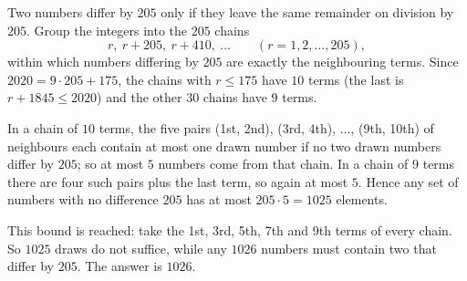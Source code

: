 Two numbers differ by $205$ only if they leave the same remainder on division by $205$. Group the integers into the $205$ chains
\[r,\ r+205,\ r+410,\ \dots\qquad(r=1,2,\dots,205),\]
within which numbers differing by $205$ are exactly the neighbouring terms. Since $2020=9\cdot205+175$, the chains with $r\le175$ have $10$ terms (the last is $r+1845\le2020$) and the other $30$ chains have $9$ terms.

In a chain of $10$ terms, the five pairs (1st, 2nd), (3rd, 4th), $\dots$, (9th, 10th) of neighbours each contain at most one drawn number if no two drawn numbers differ by $205$; so at most $5$ numbers come from that chain. In a chain of $9$ terms there are four such pairs plus the last term, so again at most $5$. Hence any set of numbers with no difference $205$ has at most $205\cdot5=1025$ elements.

This bound is reached: take the 1st, 3rd, 5th, 7th and 9th terms of every chain. So $1025$ draws do not suffice, while any $1026$ numbers must contain two that differ by $205$. The answer is $\boxed{1026}$.
